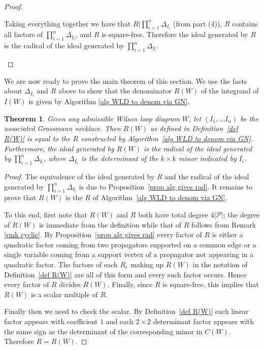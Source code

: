 \documentclass[11pt]{article}
\newtheorem{thm}{Theorem}[section]
\theoremstyle{remark}
\theoremstyle{definition}
\begin{document}
\begin{proof}
\begin{enumerate}
Taking everything together we have that $R|\prod_{i=1}^n \Delta_{I_i}$ (from part (4)), $R$ contains all factors of $\prod_{i=1}^n \Delta_{I_i}$, and $R$ is square-free.  Therefore the ideal generated by $R$ is the radical of the ideal generated by $\prod_{i=1}^n \Delta_{I_i}$.
  \end{enumerate}
\end{proof}

We are now ready to prove the main theorem of this section. We use the facts about $\Delta_{I_i}$ and $R$ above to show that the denominator $R(W)$ of the integrand of $I(W)$ is given by Algorithm \ref{alg WLD to denom via GN}.

\begin{thm}\label{thm denom}
  Given any admissible Wilson loop diagram $W$, let $(I_1, \ldots I_n)$ be the associated Grassmann necklace. Then $R(W)$ as defined in Definition~\ref{def R(W)} is equal to the $R$ constructed by Algorithm~\ref{alg WLD to denom via GN}. Furthermore, the ideal generated by $R(W)$ is the radical of the ideal generated by $\prod_{i=1}^n \Delta_{I_i}$, where $\Delta_{I_i}$ is the determinant of the $k \times k$ minor indicated by $I_i$.  
\end{thm}

\begin{proof}
The equivalence of the ideal generated by $R$ and the radical of the ideal generated by $\prod_{i=1}^n \Delta_{I_i}$ is due to Proposition~\ref{prop alg gives rad}.  It remains to prove that $R(W)$ is the $R$ of Algorithm~\ref{alg WLD to denom via GN}.

To this end, first note that $R(W)$ and $R$ both have total degree $4|\mathcal{P}|$; the degree of $R(W)$ is immediate from the definition while that of $R$ follows from Remark \ref{rmk cyclic}.  By Proposition~\ref{prop alg gives rad} every factor of $R$ is either a quadratic factor coming from two propagators supported on a common edge or a single variable coming from a support vertex of a propagator not appearing in a quadratic factor.  The factors of each $R_e$ making up $R(W)$ in the notation of Definition~\ref{def R(W)} are all of this form and every such factor occurs.  Hence every factor of $R$ divides $R(W)$.
Finally, since $R$ is square-free, this implies that $R(W)$ is a scalar multiple of $R$.

Finally then we need to check the scalar.  By Definition~\ref{def R(W)} each linear factor appears with coefficient $1$ and each $2\times 2$ determinant factor appears with the same sign as the determinant of the corresponding minor in $C(W)$.  Therefore $R=R(W)$.
\end{proof}
\end{document}
